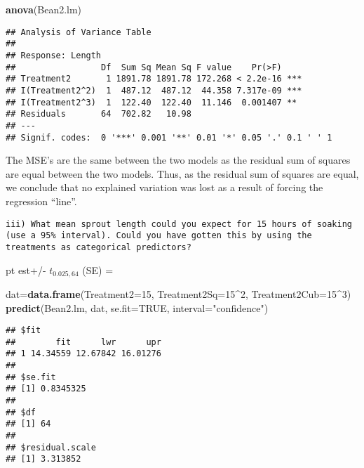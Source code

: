 \documentclass[]{article}
\newenvironment{Shaded}{\begin{snugshade}}{\end{snugshade}}
\newcommand{\KeywordTok}[1]{\textcolor[rgb]{0.13,0.29,0.53}{\textbf{#1}}}
\newcommand{\DataTypeTok}[1]{\textcolor[rgb]{0.13,0.29,0.53}{#1}}
\newcommand{\DecValTok}[1]{\textcolor[rgb]{0.00,0.00,0.81}{#1}}
\newcommand{\StringTok}[1]{\textcolor[rgb]{0.31,0.60,0.02}{#1}}
\newcommand{\OtherTok}[1]{\textcolor[rgb]{0.56,0.35,0.01}{#1}}
\newcommand{\OperatorTok}[1]{\textcolor[rgb]{0.81,0.36,0.00}{\textbf{#1}}}
\newcommand{\NormalTok}[1]{#1}
\begin{document}
\begin{Shaded}
\begin{Highlighting}[]
\KeywordTok{anova}\NormalTok{(Bean2.lm)}
\end{Highlighting}
\end{Shaded}

\begin{verbatim}
## Analysis of Variance Table
## 
## Response: Length
##                 Df  Sum Sq Mean Sq F value    Pr(>F)    
## Treatment2       1 1891.78 1891.78 172.268 < 2.2e-16 ***
## I(Treatment2^2)  1  487.12  487.12  44.358 7.317e-09 ***
## I(Treatment2^3)  1  122.40  122.40  11.146  0.001407 ** 
## Residuals       64  702.82   10.98                      
## ---
## Signif. codes:  0 '***' 0.001 '**' 0.01 '*' 0.05 '.' 0.1 ' ' 1
\end{verbatim}

The MSE's are the same between the two models as the residual sum of
squares are equal between the two models. Thus, as the residual sum of
squares are equal, we conclude that no explained variation was lost as a
result of forcing the regression ``line''.

\begin{verbatim}
iii) What mean sprout length could you expect for 15 hours of soaking (use a 95% interval). Could you have gotten this by using the treatments as categorical predictors?
\end{verbatim}

pt est+/- \(t_{0.025,64}\) (SE) =

\begin{Shaded}
\begin{Highlighting}[]
\NormalTok{dat=}\KeywordTok{data.frame}\NormalTok{(}\DataTypeTok{Treatment2=}\DecValTok{15}\NormalTok{, }\DataTypeTok{Treatment2Sq=}\DecValTok{15}\OperatorTok{^}\DecValTok{2}\NormalTok{, }\DataTypeTok{Treatment2Cub=}\DecValTok{15}\OperatorTok{^}\DecValTok{3}\NormalTok{)}
\KeywordTok{predict}\NormalTok{(Bean2.lm, dat, }\DataTypeTok{se.fit=}\OtherTok{TRUE}\NormalTok{, }\DataTypeTok{interval=}\StringTok{"confidence"}\NormalTok{)}
\end{Highlighting}
\end{Shaded}

\begin{verbatim}
## $fit
##        fit      lwr      upr
## 1 14.34559 12.67842 16.01276
## 
## $se.fit
## [1] 0.8345325
## 
## $df
## [1] 64
## 
## $residual.scale
## [1] 3.313852
\end{verbatim}
\end{document}
